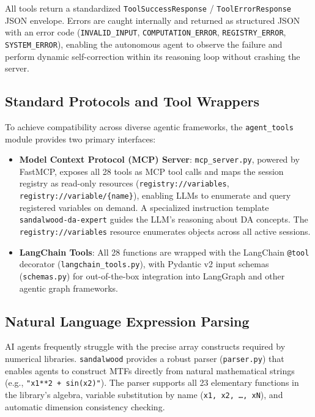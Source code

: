 \documentclass[aps,prb,reprint,superscriptaddress,nofootinbib]{revtex4-2}
\begin{document}
All tools return a standardized \texttt{ToolSuccessResponse} / \texttt{ToolErrorResponse} JSON envelope. Errors are caught internally and returned as structured JSON with an error code (\texttt{INVALID\_INPUT}, \texttt{COMPUTATION\_ERROR}, \texttt{REGISTRY\_ERROR}, \texttt{SYSTEM\_ERROR}), enabling the autonomous agent to observe the failure and perform dynamic self-correction within its reasoning loop without crashing the server.

\subsection{Standard Protocols and Tool Wrappers}

To achieve compatibility across diverse agentic frameworks, the \texttt{agent\_tools} module provides two primary interfaces:
\begin{itemize}
    \item \textbf{Model Context Protocol (MCP) Server}: \texttt{mcp\_server.py}, powered by FastMCP, exposes all 28 tools as MCP tool calls and maps the session registry as read-only resources (\texttt{registry://variables}, \texttt{registry://variable/\{name\}}), enabling LLMs to enumerate and query registered variables on demand. A specialized instruction template \texttt{sandalwood-da-expert} guides the LLM's reasoning about DA concepts. The \texttt{registry://variables} resource enumerates objects across all active sessions.
    \item \textbf{LangChain Tools}: All 28 functions are wrapped with the LangChain \texttt{@tool} decorator (\texttt{langchain\_tools.py}), with Pydantic v2 input schemas (\texttt{schemas.py}) for out-of-the-box integration into LangGraph and other agentic graph frameworks.
\end{itemize}

\subsection{Natural Language Expression Parsing}

AI agents frequently struggle with the precise array constructs required by numerical libraries. \texttt{sandalwood} provides a robust parser (\texttt{parser.py}) that enables agents to construct MTFs directly from natural mathematical strings (e.g., \texttt{"x1**2 + sin(x2)"}). The parser supports all 23 elementary functions in the library's algebra, variable substitution by name (\texttt{x1, x2, \ldots, xN}), and automatic dimension consistency checking.
\end{document}
